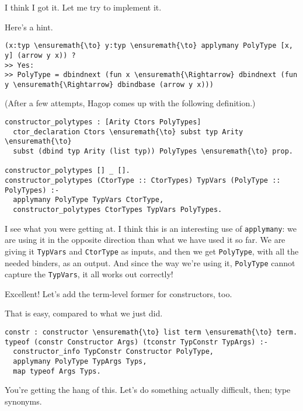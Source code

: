 \heroSTUDENT{} I think I got it. Let me try to implement it.

\heroADVISOR{} Here's a hint.

\begin{verbatim}
(x:typ \ensuremath{\to} y:typ \ensuremath{\to} applymany PolyType [x, y] (arrow y x)) ?
>> Yes:
>> PolyType = dbindnext (fun x \ensuremath{\Rightarrow} dbindnext (fun y \ensuremath{\Rightarrow} dbindbase (arrow y x)))
\end{verbatim}

\begin{scenecomment}
(After a few attempts, Hagop comes up with the following definition.)
\end{scenecomment}

\begin{verbatim}
constructor_polytypes : [Arity Ctors PolyTypes]
  ctor_declaration Ctors \ensuremath{\to} subst typ Arity \ensuremath{\to}
  subst (dbind typ Arity (list typ)) PolyTypes \ensuremath{\to} prop.

constructor_polytypes [] _ [].
constructor_polytypes (CtorType :: CtorTypes) TypVars (PolyType :: PolyTypes) :-
  applymany PolyType TypVars CtorType,
  constructor_polytypes CtorTypes TypVars PolyTypes.
\end{verbatim}

\heroSTUDENT{} I see what you were getting at. I think this is an interesting
use of \texttt{applymany}: we are using it in the opposite direction
than what we have used it so far. We are giving it \texttt{TypVars} and
\texttt{CtorType} as inputs, and then we get \texttt{PolyType}, with all
the needed binders, as an output. And since the way we're using it,
\texttt{PolyType} cannot capture the \texttt{TypVars}, it all works out
correctly!

\heroADVISOR{} Excellent! Let's add the term-level former for constructors,
too.

\heroSTUDENT{} That is easy, compared to what we just did.

\begin{verbatim}
constr : constructor \ensuremath{\to} list term \ensuremath{\to} term.
typeof (constr Constructor Args) (tconstr TypConstr TypArgs) :-
  constructor_info TypConstr Constructor PolyType,
  applymany PolyType TypArgs Typs,
  map typeof Args Typs.
\end{verbatim}

\heroADVISOR{} You're getting the hang of this. Let's do something actually
difficult, then; type synonyms.

